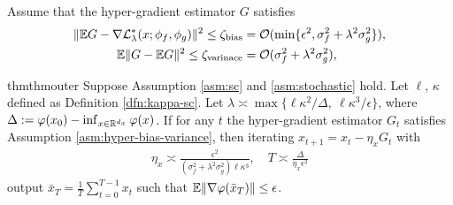 {\begin{asm} \label{asm:hyper-bias-variance}
Assume that the hyper-gradient estimator $G$ satisfies 
\begin{align} \label{eq:cond-HE}
\begin{split}
 \Vert {\mathbb{E}} G -  \nabla {\mathcal{L}}_{\lambda}^*(x; \phi_f, \phi_g )  \Vert^2 \le \zeta_{\rm bias} &= {\mathcal{O}}( \min\{ \epsilon^2, \sigma_f^2 + \lambda^2 \sigma_g^2 \}), \\
{\mathbb{E}} \Vert G - {\mathbb{E}} G \Vert^2 \le \zeta_{\rm varinace} &= {\mathcal{O}}(\sigma_f^2 + \lambda^2 \sigma_g^2),
\end{split}
\end{align}
\end{asm}
\begin{restatable}{thm}{thmouter} \label{thm:outer}
    Suppose Assumption \ref{asm:sc} and \ref{asm:stochastic} hold. 
Let $\ell$,  $\kappa$ defined as Definition \ref{dfn:kappa-sc}. Let
$\lambda \asymp \max\{ \ell \kappa^2 / \Delta, ~\ell \kappa^3 / \epsilon \}$, where $\Delta:=\varphi(x_0) - \inf_{x \in {\mathbb{R}}^{d_x}} \varphi(x)$.
If for any $t$ the hyper-gradient estimator $G_t$ satisfies Assumption \ref{asm:hyper-bias-variance},
then iterating $ x_{t+1}  = x_t - \eta_x G_t$ with
\begin{align} \label{eq:eta-outer-F2BSA}
    \eta_x \asymp \frac{\epsilon^2}{(\sigma_f^2 + \lambda^2 \sigma_g^2)  \ell 
 \kappa^3}, \quad T \asymp \frac{\Delta}{\eta_x \epsilon^2} 
\end{align}
output $\bar x_T = \frac{1}{T} \sum_{t=0}^{T-1} x_t$ such that ${\mathbb{E}} \Vert \nabla \varphi(\bar x_T) \Vert \le \epsilon$. 
\end{restatable}




}
